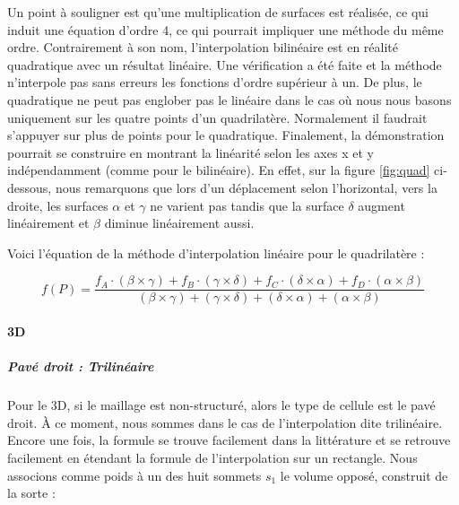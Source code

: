 Un point à souligner est qu'une multiplication de surfaces est réalisée, ce qui induit une équation d'ordre 4, ce qui pourrait impliquer une méthode du même ordre.
Contrairement à son nom, l'interpolation bilinéaire est en réalité quadratique avec un résultat linéaire.
Une vérification a été faite et la méthode n'interpole pas sans erreurs les fonctions d'ordre supérieur à un.
De plus, le quadratique ne peut pas englober pas le linéaire dans le cas où nous nous basons uniquement sur les quatre points d'un quadrilatère.
Normalement il faudrait s'appuyer sur plus de points pour le quadratique. 
Finalement, la démonstration pourrait se construire en montrant la linéarité selon les axes x et y indépendamment (comme pour le bilinéaire). En effet, sur la figure \ref{fig:quad} ci-dessous, nous remarquons que lors d'un déplacement selon l'horizontal, vers la droite, les surfaces \(\alpha\) et \(\gamma\) ne varient pas tandis que la surface \(\delta\) augment linéairement et \(\beta\) diminue linéairement aussi.

Voici l'équation de la méthode d'interpolation linéaire pour le quadrilatère :

\begin{equation}
    f(P) = \frac{f_{A} \cdot (\beta \times \gamma) + f_{B} \cdot (\gamma \times \delta) + f_{C} \cdot (\delta \times \alpha) + f_{D} \cdot (\alpha \times \beta)}{(\beta \times \gamma) + (\gamma \times \delta) + (\delta \times \alpha) + (\alpha \times \beta)}
\end{equation}
    

\vspace{0.5cm}  %


\paragraph{3D}
\subparagraph{Pavé droit : Trilinéaire}

Pour le 3D, si le maillage est non-structuré, alors le type de cellule est le pavé droit. À ce moment, nous sommes dans le cas de l'interpolation dite trilinéaire. Encore une fois, la formule se trouve facilement dans la littérature et se retrouve facilement en étendant la formule de l'interpolation sur un rectangle. Nous associons comme poids à un des huit sommets \( s_1 \) le volume opposé, construit de la sorte :

